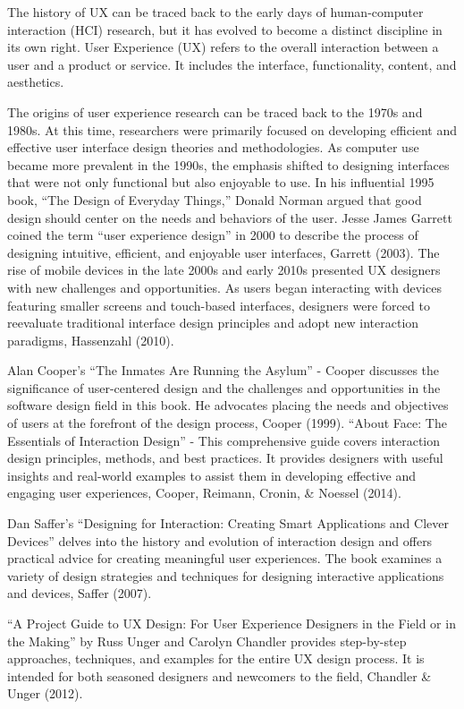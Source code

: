 \documentclass[print]{nuthesis}
\begin{document}
The history of UX can be traced back to the early days of human-computer interaction (HCI) research, but it has evolved to become a distinct discipline in its own right. User Experience (UX) refers to the overall interaction between a user and a product or service. It includes the interface, functionality, content, and aesthetics.

The origins of user experience research can be traced back to the 1970s and 1980s.
At this time, researchers were primarily focused on developing efficient and effective user interface design theories and methodologies.
As computer use became more prevalent in the 1990s, the emphasis shifted to designing interfaces that were not only functional but also enjoyable to use.
In his influential 1995 book, ``The Design of Everyday Things,'' Donald Norman argued that good design should center on the needs and behaviors of the user.
Jesse James Garrett coined the term ``user experience design'' in 2000 to describe the process of designing intuitive, efficient, and enjoyable user interfaces, Garrett (2003).
The rise of mobile devices in the late 2000s and early 2010s presented UX designers with new challenges and opportunities.
As users began interacting with devices featuring smaller screens and touch-based interfaces, designers were forced to reevaluate traditional interface design principles and adopt new interaction paradigms, Hassenzahl (2010).

Alan Cooper's ``The Inmates Are Running the Asylum'' - Cooper discusses the significance of user-centered design and the challenges and opportunities in the software design field in this book.
He advocates placing the needs and objectives of users at the forefront of the design process, Cooper (1999).
``About Face: The Essentials of Interaction Design'' - This comprehensive guide covers interaction design principles, methods, and best practices.
It provides designers with useful insights and real-world examples to assist them in developing effective and engaging user experiences, Cooper, Reimann, Cronin, \& Noessel (2014).

Dan Saffer's ``Designing for Interaction: Creating Smart Applications and Clever Devices'' delves into the history and evolution of interaction design and offers practical advice for creating meaningful user experiences.
The book examines a variety of design strategies and techniques for designing interactive applications and devices, Saffer (2007).

``A Project Guide to UX Design: For User Experience Designers in the Field or in the Making'' by Russ Unger and Carolyn Chandler provides step-by-step approaches, techniques, and examples for the entire UX design process.
It is intended for both seasoned designers and newcomers to the field, Chandler \& Unger (2012).
\end{document}
